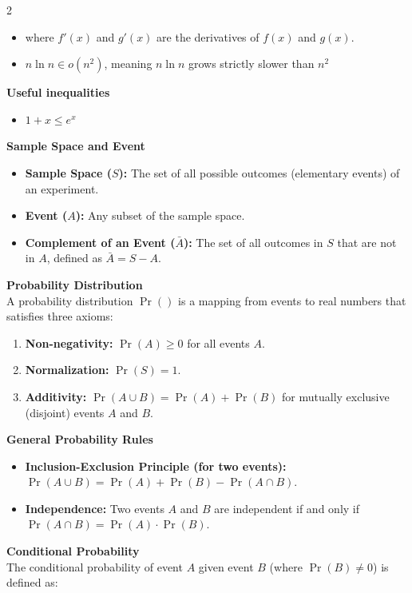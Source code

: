 \documentclass[10pt,landscape]{article}
\begin{document}
\begin{multicols*}{2}
\begin{itemize}
    \item where $f'(x)$ and $g'(x)$ are the derivatives of $f(x)$ and $g(x)$.
    \item $n \ln n \in o(n^2)$, meaning $n \ln n$ grows strictly slower than $n^2$
\end{itemize}
\vspace{8pt}
\textbf{Useful inequalities}
\begin{itemize}
    \item $1 + x \leq e^x$
\end{itemize}
\vspace{8pt}
\textbf{Sample Space and Event}
\begin{itemize}
    \item \textbf{Sample Space ($S$):} The set of all possible outcomes (elementary events) of an experiment.
    \item \textbf{Event ($A$):} Any subset of the sample space.
    \item \textbf{Complement of an Event ($\bar{A}$):} The set of all outcomes in $S$ that are not in $A$, defined as $\bar{A} = S - A$.
\end{itemize}
\vspace{8pt}
\textbf{Probability Distribution} \\
A probability distribution $\Pr()$ is a mapping from events to real numbers that satisfies three axioms:
\begin{enumerate}
    \item \textbf{Non-negativity:} $\Pr(A) \ge 0$ for all events $A$.
    \item \textbf{Normalization:} $\Pr(S) = 1$.
    \item \textbf{Additivity:} $\Pr(A \cup B) = \Pr(A) + \Pr(B)$ for mutually exclusive (disjoint) events $A$ and $B$.
\end{enumerate}
\vspace{8pt}
\textbf{General Probability Rules}
\begin{itemize}
    \item \textbf{Inclusion-Exclusion Principle (for two events):} $\Pr(A \cup B) = \Pr(A) + \Pr(B) - \Pr(A \cap B)$.
    \item \textbf{Independence:} Two events $A$ and $B$ are independent if and only if $\Pr(A \cap B) = \Pr(A) \cdot \Pr(B)$.
\end{itemize}
\vspace{8pt}
\textbf{Conditional Probability} \\
The conditional probability of event $A$ given event $B$ (where $\Pr(B) \ne 0$) is defined as:

\end{multicols*}
\end{document}
